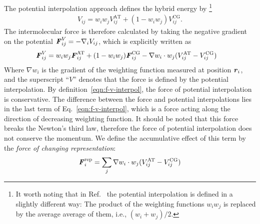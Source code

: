 \documentclass[epjST]{svjour}
\newcommand{\recheck}[1]{{\color{red} #1}}
\newcommand{\vect}[1]{\textbf{\textit{#1}}}
\newcommand{\AT}[0]{\textrm{AT}}
\newcommand{\CG}[0]{\textrm{CG}}
\newcommand{\moleidxone}[0]{i}
\newcommand{\moleidxtwo}[0]{j}
\newcommand{\rep}{{\textrm{rep}}}
\begin{document}
The potential interpolation approach defines the hybrid energy by
\footnote{
\recheck{
  It worth noting that in Ref.~\cite{potestio2013hamiltonian} the potential interpolation is defined in a slightly different way:
  The product of the weighting functions $w_\moleidxone w_\moleidxtwo$ is replaced by the average average of them, i.e., $(w_\moleidxone + w_\moleidxtwo)/2$.}}
\begin{align}\label{eqn:v-v-interpol}
  {V}_{\moleidxone \moleidxtwo}=w_\moleidxone w_\moleidxtwo{V}_{\moleidxone\moleidxtwo}^{\AT}+(1-w_\moleidxone w_\moleidxtwo){V}^{\CG}_{\moleidxone\moleidxtwo}.
\end{align}
The intermolecular force is therefore calculated by taking the negative gradient on the potential ${\vect F}^V_{\moleidxone \moleidxtwo}= -\nabla_{\moleidxone}{V}_{\moleidxone \moleidxtwo}$,
which is explicitly written as
\begin{align}\label{eqn:f-v-interpol}
  {\vect F}^V_{\moleidxone \moleidxtwo}
  &=w_\moleidxone w_\moleidxtwo{\vect F}_{\moleidxone\moleidxtwo}^{\AT}+(1-w_\moleidxone w_\moleidxtwo){\vect F}^{\CG}_{\moleidxone\moleidxtwo}  - \nabla w_\moleidxone\cdot w_\moleidxtwo (V^\AT_{\moleidxone \moleidxtwo} - V^\CG_{\moleidxone \moleidxtwo})
\end{align}
Where $\nabla w_\moleidxone$ is the gradient of the weighting function measured at position $\vect r_\moleidxone$,
and the superscript ``$V$'' denotes that the force is defined
by the potential interpolation.
By  definition~\eqref{eqn:f-v-interpol}, the force of potential interpolation is conservative. 
The difference between the force and potential
interpolations lies in the last term  of Eq.~\eqref{eqn:f-v-interpol}, which is a force
acting along the direction of decreasing weighting function.
It should be noted that
this force breaks the Newton's third law, therefore the force of potential interpolation
does not conserve the momentum.
We define the accumulative effect of this term by the \emph{force of changing representation}:
\begin{align}
  \vect F_\moleidxone^\rep = \sum_{\moleidxtwo}  \nabla w_\moleidxone\cdot w_\moleidxtwo (V^\AT_{\moleidxone \moleidxtwo} - V^\CG_{\moleidxone \moleidxtwo})
\end{align}
\end{document}
